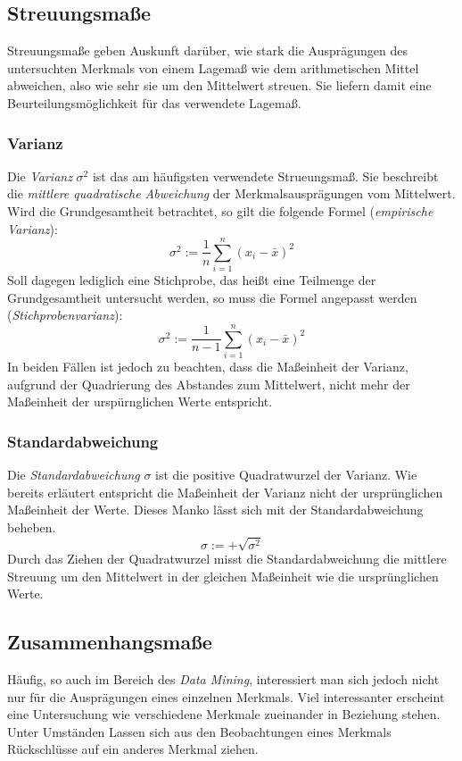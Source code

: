 \documentclass[fontsize=11pt]{scrartcl}
\begin{document}
                \subsection{Streuungsmaße}
                    Streuungsmaße geben Auskunft darüber, wie stark die Ausprägungen des untersuchten Merkmals von einem Lagemaß wie dem arithmetischen Mittel abweichen, also wie sehr sie um den Mittelwert streuen. Sie liefern damit eine Beurteilungsmöglichkeit für das verwendete Lagemaß.\cite{ertel2016,kohn2005}
                    
                    \subsubsection{Varianz}
                        Die \emph{Varianz} $\sigma^2$ ist das am häufigsten verwendete Strueungsmaß. Sie beschreibt die \emph{mittlere quadratische Abweichung} der Merkmalsausprägungen vom Mittelwert.
                        Wird die Grundgesamtheit betrachtet, so gilt die folgende Formel (\emph{empirische Varianz}): 
                        $$ \sigma^2 := \frac{1}{n}\sum_{i=1}^n(x_i - \bar{x})^2 $$
                        Soll dagegen lediglich eine Stichprobe, das heißt eine Teilmenge der Grundgesamtheit untersucht werden, so muss die Formel angepasst werden (\emph{Stichprobenvarianz}):
                        $$ \sigma^2 := \frac{1}{n-1}\sum_{i=1}^n(x_i - \bar{x})^2  $$
                        In beiden Fällen ist jedoch zu beachten, dass die Maßeinheit der Varianz, aufgrund der Quadrierung des Abstandes zum Mittelwert, nicht mehr der Maßeinheit der urspürnglichen Werte entspricht.\cite{kohn2005}
                    
                    \subsubsection{Standardabweichung}
                        Die \emph{Standardabweichung} $\sigma$ ist die positive Quadratwurzel der Varianz. Wie bereits erläutert entspricht die Maßeinheit der Varianz nicht der ursprünglichen Maßeinheit der Werte. Dieses Manko lässt sich mit der Standardabweichung beheben.
                        $$ \sigma := + \sqrt{\sigma^2} $$
                        Durch das Ziehen der Quadratwurzel misst die Standardabweichung die mittlere Streuung um den Mittelwert in der gleichen Maßeinheit wie die ursprünglichen Werte.\cite{kohn2005}

                \subsection{Zusammenhangsmaße}
                    Häufig, so auch im Bereich des \emph{Data Mining}, interessiert man sich jedoch nicht nur für die Ausprägungen eines einzelnen Merkmals. Viel interessanter erscheint eine Untersuchung wie verschiedene Merkmale zueinander in Beziehung stehen. Unter Umständen Lassen sich aus den Beobachtungen eines Merkmals Rückschlüsse auf ein anderes Merkmal ziehen.
                    
\end{document}

